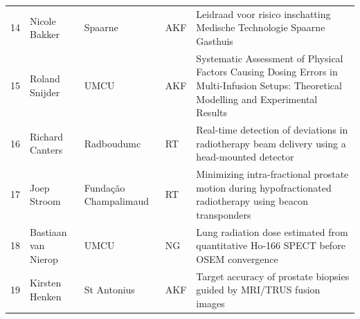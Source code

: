 \documentclass[a4paper,10pt]{report}
\begin{document}
\begin{tabular}{llllp{18cm}}
  14&Nicole Bakker &  Spaarne&  AKF&  Leidraad voor risico inschatting Medische Technologie Spaarne Gasthuis\\
  15&Roland Snijder & UMCU &    AKF& Systematic Assessment of Physical Factors Causing Dosing Errors in Multi-Infusion Setups: Theoretical Modelling and Experimental Results\\
  16&Richard Canters &  Radboudumc &  RT&  Real-time detection of deviations in radiotherapy beam delivery using a head-mounted detector\\
  17&Joep Stroom &  Fundação Champalimaud & RT &  Minimizing intra-fractional prostate motion during hypofractionated radiotherapy using beacon transponders\\
  18&Bastiaan van Nierop&  UMCU&     NG & Lung radiation dose estimated from quantitative Ho-166 SPECT before OSEM convergence\\
  19&Kirsten Henken &  St Antonius&  AKF & Target accuracy of prostate biopsies guided by MRI/TRUS fusion images
\end{tabular}


\end{document}
